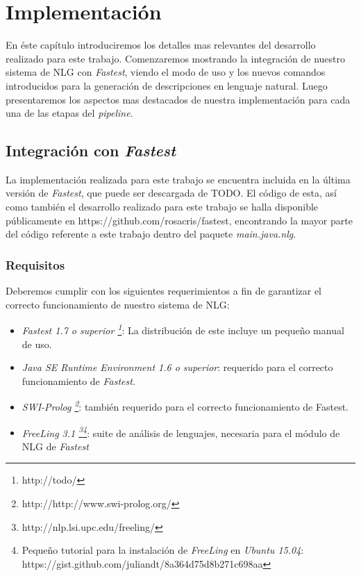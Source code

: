 \chapter{Implementación}
\label{cap:implementacion}

En éste capítulo introduciremos los detalles mas relevantes del desarrollo realizado para este trabajo. Comenzaremos mostrando la integración de nuestro sistema de NLG con \textit{Fastest}, viendo el modo de uso y los nuevos comandos introducidos para la generación de descripciones en lenguaje natural. Luego presentaremos los aspectos mas destacados de nuestra implementación para cada una de las etapas del \emph{pipeline}.

\section{Integración con \emph{Fastest}}

La implementación realizada para este trabajo se encuentra incluida en la última versión de \emph{Fastest}, que puede ser descargada de TODO. El código de esta, así como también el desarrollo realizado para este trabajo se halla disponible públicamente en https://github.com/rosacris/fastest, encontrando la mayor parte del código referente a este trabajo dentro del paquete \textit{main.java.nlg}.

\subsection*{Requisitos}

Deberemos cumplir con los siguientes requerimientos a fin de garantizar el correcto funcionamiento de nuestro sistema de NLG:
\begin{itemize}
 \item  \emph{Fastest 1.7 o superior \footnote{http://todo/}}: La distribución de este incluye un pequeño manual de uso.
 \item  \emph{Java SE Runtime Environment 1.6 o superior}: requerido para el correcto funcionamiento de \emph{Fastest}.
 \item  \emph{SWI-Prolog \footnote{http://http://www.swi-prolog.org/}}: también requerido para el correcto funcionamiento de Fastest.
 \item  \emph{FreeLing 3.1 \footnote{http://nlp.lsi.upc.edu/freeling/}\footnote{Pequeño tutorial para la instalación de \emph{FreeLing} en \emph{Ubuntu 15.04}: https://gist.github.com/juliandt/8a364d75d8b271c698aa}}: suite de análisis de lenguajes, necesaria para el módulo de NLG de \emph{Fastest}
\end{itemize}

